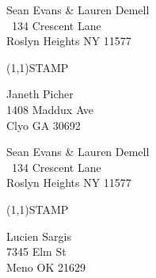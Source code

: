 \documentclass[12pt]{article}
\begin{document}
\clearpage

\begin{minipage}{.5\linewidth} \noindent
Sean Evans \& Lauren Demell\\\ 
134 Crescent Lane\\ 
Roslyn Heights NY 11577
\end{minipage}
\begin{minipage}{.5\linewidth \hspace{-.2in} \vspace{-.3in}}
\begin{flushright}
\framebox(1,1){STAMP}
\end{flushright}
\end{minipage}

\begin{center} \begin{Huge} \vspace*{\fill}
Janeth Picher\\
1408 Maddux Ave\\
Clyo GA 30692\\
\vspace{\fill} \end{Huge} \end{center}

\clearpage

\begin{minipage}{.5\linewidth} \noindent
Sean Evans \& Lauren Demell\\\ 
134 Crescent Lane\\ 
Roslyn Heights NY 11577
\end{minipage}
\begin{minipage}{.5\linewidth \hspace{-.2in} \vspace{-.3in}}
\begin{flushright}
\framebox(1,1){STAMP}
\end{flushright}
\end{minipage}

\begin{center} \begin{Huge} \vspace*{\fill}
Lucien Sargis\\
7345 Elm St\\
Meno OK 21629\\
\vspace{\fill} \end{Huge} \end{center}

\clearpage
\end{document}
